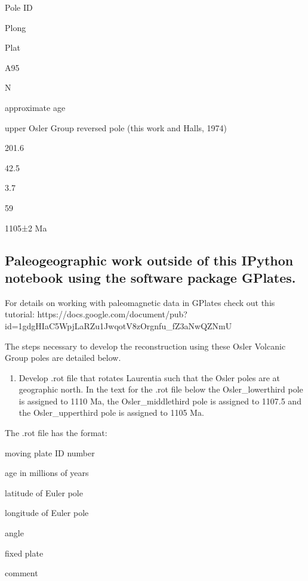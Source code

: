 \documentclass[letterpaper,10pt,english]{/Users/polarwander/Library/Enthought/Canopy_64bit/User/lib/python2.7/site-packages/sphinx/texinputs/sphinxhowto}
\begin{document}
        
    
Pole ID

Plong

Plat

A95

N

approximate age

upper Osler Group reversed pole (this work and Halls, 1974)

201.6

42.5

3.7

59

1105±2 Ma\subsection{Paleogeographic work outside of this IPython notebook using the software
package GPlates.}For details on working with paleomagnetic data in GPlates check out this
tutorial:
https://docs.google.com/document/pub?id=1gdgHIaC5WpjLaRZu1JwqotV8zOrgnfu\_fZ3aNwQZNmU

The steps necessary to develop the reconstruction using these Osler
Volcanic Group poles are detailed below.\begin{enumerate}
\def\labelenumi{(\arabic{enumi})}
\itemsep1pt\parskip0pt
\item
  Develop .rot file that rotates Laurentia such that the Osler poles are
  at geographic north. In the text for the .rot file below the
  Osler\_lowerthird pole is assigned to 1110 Ma, the Osler\_middlethird
  pole is assigned to 1107.5 and the Osler\_upperthird pole is assigned
  to 1105 Ma.
\end{enumerate}

The .rot file has the format:

moving plate ID number

age in millions of years

latitude of Euler pole

longitude of Euler pole

angle

fixed plate

comment
\end{document}
